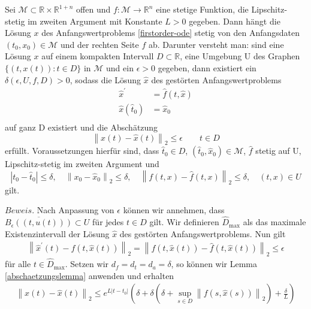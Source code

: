 \begin{satz}
    \label{Satz-stet-abh}
    Sei $\mathcal{M} \subset \mathbb{R} \times \mathbb{R}^{1+n}$ offen und $f:\mathcal{M} \rightarrow \mathbb{R}^{n}$
    eine stetige Funktion, die Lipschitz-stetig im zweiten Argument mit Konstante $L>0$ gegeben. Dann hängt die
    Lösung $x$ des Anfangswertproblems \eqref{firstorder-ode} stetig von den Anfangsdaten $(t_0, x_0) \in \mathcal{M}$
    und der rechten Seite $f$ ab. Darunter versteht man:
    sind eine Lösung $x$ auf einem kompakten Intervall $D \subset \mathbb{R}$, eine Umgebung U des Graphen
    $\{(t,x(t)): t \in D\}$ in $\mathcal{M}$ und ein $\epsilon>0$ gegeben, dann existiert ein
    $\delta(\epsilon, U, f, D) >0$, sodass die Lösung $\hat{x}$ des gestörten Anfangswertproblems
    \begin{align*}
        \hat{x}^{\prime} &= \hat{f}(t,\hat{x})\\
        \hat{x}(\hat{t}_0) &= \hat{x}_0 \\
    \end{align*}
    auf ganz D existiert und die Abschätzung
    \[
        \left\lVert x(t) - \hat{x}(t) \right\rVert_2 \leq \epsilon \qquad t \in D
    \]
    erfüllt. Voraussetzungen hierfür sind, dass $\hat{t}_0 \in D$, $(\hat{t}_0, \hat{x}_0) \in \mathcal{M}$, $\hat{f}$
    stetig auf U, Lipschitz-stetig im zweiten Argument und
    \[
        |t_0 - \hat{t}_0| \leq \delta, \quad \left\lVert x_0 - \hat{x}_0 \right\rVert_2 \leq \delta, \quad
        \left\lVert f(t,x) - \hat{f}(t,x) \right\rVert_2 \leq \delta, \quad (t,x) \in U
    \] gilt.
\end{satz}
$Beweis.$ Nach Anpassung von $\epsilon$ können wir annehmen, dass $\overline{B_{\epsilon}((t, u(t)))} \subset U$ für
jedes $t \in D$ gilt. Wir definieren $\hat{D}_{\text{max}}$ als das maximale Existenzintervall der Lösung $\hat{x}$ des
gestörten Anfangswertproblems. Nun gilt
\begin{align*}
    \left\lVert \hat{x}^{\prime}(t) - f(t, \hat{x}(t)) \right\rVert_2 =
    \left\lVert f(t,\hat{x}(t)) - \hat{f}(t, \hat{x}(t)) \right\rVert_2 \leq \epsilon
\end{align*}
für alle $t \in \hat{D}_{\text{max}}$. Setzen wir $d_f = d_t = d_a = \delta$, so können wir Lemma
\ref{abschaetzungslemma} anwenden und erhalten
\begin{align*}
    \left\lVert x(t) - \hat{x}(t)\right\rVert_2 \leq e^{L|t-t_0|}(\delta + \delta(\delta +
    \sup\limits_{s \in D}\left\lVert f(s,\hat{x}(s))\right\rVert_2) + \frac{\delta}{L})
\end{align*}
